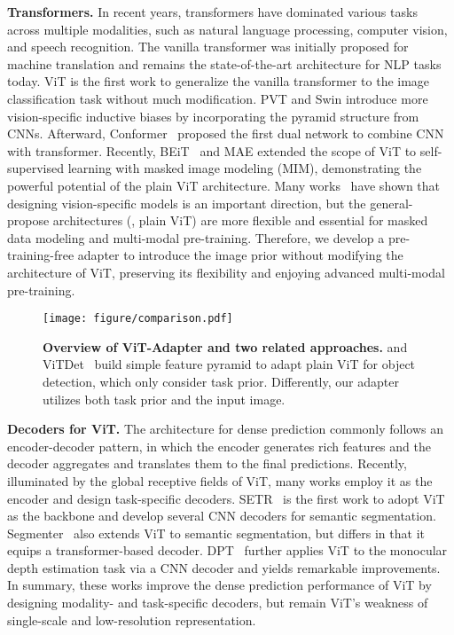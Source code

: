 \documentclass{article} \usepackage{iclr2023_conference,times}
\begin{document}
\noindent \textbf{Transformers.}
In recent years, transformers have dominated various tasks across multiple modalities, such as natural language processing, computer vision, and speech recognition. 
The vanilla transformer \citep{vaswani2017attention} was initially proposed for machine translation and remains the state-of-the-art architecture for NLP tasks today.
ViT \citep{dosovitskiy2020image} is the first work to generalize the vanilla transformer to the image classification task without much modification. 
PVT \citep{wang2021pyramid} and Swin \citep{liu2021swin} introduce more vision-specific inductive biases by incorporating the pyramid structure from CNNs.
Afterward, Conformer~\citep{peng2021conformer} proposed the first dual network to combine CNN with transformer.
Recently, BEiT~\citep{bao2021beit} and MAE \citep{he2021masked} extended the scope of ViT to self-supervised learning with masked image modeling (MIM), demonstrating the powerful potential of the plain ViT architecture.
Many works~\citep{li2021benchmarking,zhu2021uni,zhu2022uni,wang2022beit3} have shown that designing vision-specific models is an important direction, but the general-propose architectures (\eg, plain ViT) are more flexible and essential for masked data modeling and multi-modal pre-training.
Therefore, we develop a pre-training-free adapter to introduce the image prior without modifying the architecture of ViT, preserving its flexibility and enjoying advanced multi-modal pre-training.
\begin{figure}[tbp]
    \centering
    \texttt{[image: figure/comparison.pdf]}
    \vspace{-0.5em}
    \caption{
        \textbf{Overview of ViT-Adapter and two related approaches.}
        \citet{li2021benchmarking} and ViTDet~\citep{li2022exploring} build simple feature pyramid to adapt plain ViT for object detection, which only consider task prior.
        Differently, our adapter utilizes both task prior and the input image.
        }
    \label{fig:comparison}
\end{figure}


\noindent \textbf{Decoders for ViT.}
The architecture for dense prediction commonly follows an encoder-decoder pattern, in which the encoder generates rich features and the decoder aggregates and translates them to the final predictions.
Recently, illuminated by the global receptive fields of ViT, many works employ it as the encoder and design task-specific decoders.
SETR~\citep{zheng2021rethinking} is the first work to adopt ViT as the backbone and develop several CNN decoders for semantic segmentation.
Segmenter~\citep{strudel2021segmenter} also extends ViT to semantic segmentation, but differs in that it equips a transformer-based decoder.
DPT~\citep{ranftl2021vision} further applies ViT to the monocular depth estimation task via a CNN decoder and yields remarkable improvements.
In summary, these works improve the dense prediction performance of ViT by designing modality- and task-specific decoders, but remain ViT's weakness of single-scale and low-resolution representation.
\end{document}
